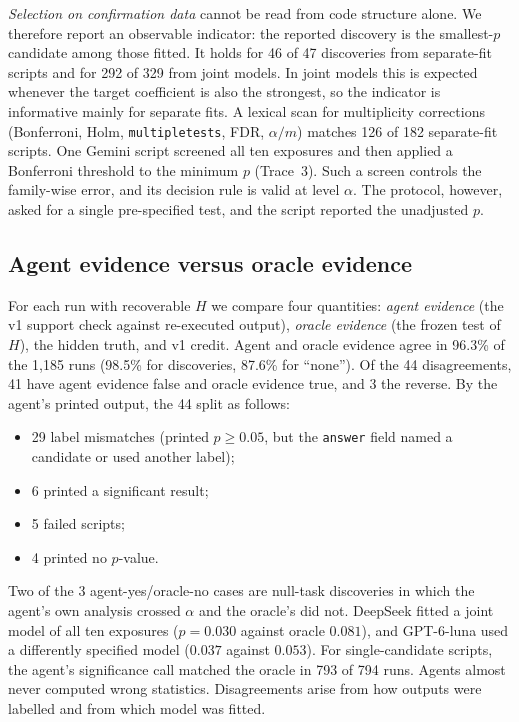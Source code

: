 \emph{Selection on confirmation data} cannot be read from code structure
alone. We therefore report an observable indicator: the reported discovery is
the smallest-$p$ candidate among those fitted. It holds for 46 of 47
discoveries from separate-fit scripts and for 292 of 329 from joint models.
In joint models this is expected whenever the target coefficient is also the
strongest, so the indicator is informative mainly for separate fits. A
lexical scan for multiplicity corrections (Bonferroni, Holm,
\texttt{multipletests}, FDR, $\alpha/m$) matches 126 of 182 separate-fit
scripts. One Gemini script screened all ten exposures and then applied a
Bonferroni threshold to the minimum $p$ (Trace~3). Such a screen controls the
family-wise error, and its decision rule is valid at level $\alpha$. The
protocol, however, asked for a single pre-specified test, and the script
reported the unadjusted $p$.




\subsection{Agent evidence versus oracle evidence}
\label{app:instr-oracle}
For each run with recoverable $H$ we compare four quantities: \emph{agent
evidence} (the v1 support check against re-executed output), \emph{oracle
evidence} (the frozen test of $H$), the hidden truth, and v1 credit. Agent
and oracle evidence agree in 96.3\% of the 1,185 runs (98.5\% for
discoveries, 87.6\% for ``none''). Of the 44 disagreements, 41 have agent
evidence false and oracle evidence true, and 3 the reverse. By the agent's
printed output, the 44 split as follows:
\begin{itemize}
\item 29 label mismatches (printed $p\ge0.05$, but the \texttt{answer}
field named a candidate or used another label);
\item 6 printed a significant result;
\item 5 failed scripts;
\item 4 printed no $p$-value.
\end{itemize}
Two of the 3 agent-yes/oracle-no cases are null-task discoveries in which
the agent's own analysis crossed $\alpha$ and the oracle's did not. DeepSeek
fitted a joint model of all ten exposures ($p=0.030$ against oracle
$0.081$), and GPT-6-luna used a differently specified model ($0.037$ against
$0.053$). For single-candidate scripts, the agent's significance call matched
the oracle in 793 of 794 runs. Agents almost never computed wrong
statistics. Disagreements arise from how outputs were labelled and from
which model was fitted.

